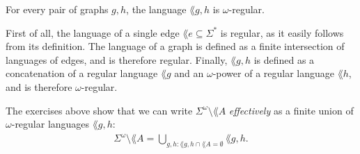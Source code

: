 \begin{exercise}
    For every pair of graphs $g, h$,
    the language $\lang {g, h}$ is $\omega$-regular.
\end{exercise}
\begin{solution}
    First of all, the language of a single edge $\lang e \subseteq \Sigma^*$ is regular,
    as it easily follows from its definition.
    The language of a graph is defined as a finite intersection of languages of edges, and is therefore regular.
    Finally, $\lang {g, h}$ is defined as a concatenation of a regular language $\lang g$
    and an $\omega$-power of a regular language $\lang h$, and is therefore $\omega$-regular.
\end{solution}

The exercises above show that we can write $\Sigma^\omega \setminus \lang A$
\emph{effectively} as a finite union of $\omega$-regular languages $\lang {g, h}$:
%
\begin{align}
    \Sigma^\omega \setminus \lang A
        = \bigcup_{g, h : \lang {g, h} \cap \lang A = \emptyset} \lang {g, h}.
\end{align}




